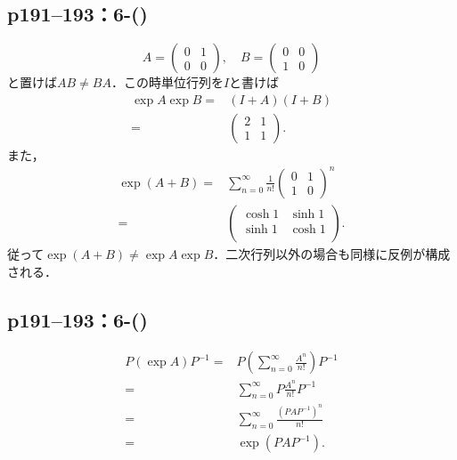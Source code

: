 \subsection*{p191--193：6-()}
\begin{tproof}
    \[
        A =
        \begin{pmatrix}
            0 & 1 \\
            0 & 0
        \end{pmatrix}, \quad
        B =
        \begin{pmatrix}
            0 & 0 \\
            1 & 0
        \end{pmatrix}
    \]
    と置けば$AB \neq BA$．この時単位行列を$I$と書けば
    \begin{align*}
        \exp A \exp B ={} & (I + A) (I + B) \\
        ={}               &
        \begin{pmatrix}
            2 & 1 \\
            1 & 1
        \end{pmatrix}.
    \end{align*}
    また，
    \begin{align*}
        \exp(A + B) ={} & \sum_{n=0}^\infty \frac{1}{n!} \begin{pmatrix} 0 & 1 \\ 1 & 0\end{pmatrix}^n \\
        ={}             &
        \begin{pmatrix}
            \cosh 1 & \sinh 1 \\
            \sinh 1 & \cosh 1 \\
        \end{pmatrix}.
    \end{align*}
    従って$\exp(A + B) \neq \exp A \exp B$．二次行列以外の場合も同様に反例が構成される．
\end{tproof}


\subsection*{p191--193：6-()}

\begin{tproof}
    \begin{align*}
        P (\exp A)P^{-1} ={} & P\left(\sum_{n = 0}^\infty \frac{A^n}{n!}\right) P^{-1} \\
        ={}                  & \sum_{n = 0}^\infty P \frac{A^n}{n!} P^{-1}             \\
        ={}                  & \sum_{n = 0}^\infty \frac{(PAP^{-1})^n}{n!}             \\
        ={}                  & \exp(PAP^{-1}).
    \end{align*}
\end{tproof}